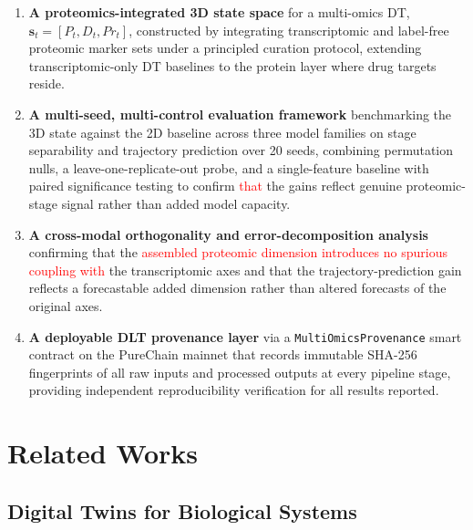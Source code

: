 \documentclass[5p,times,twocolumn]{elsarticle}
\newcommand{\rtag}[1]{}
\newcommand{\rev}[2]{\rtag{#1}\textcolor{red}{#2}}
\newcommand{\lang}[1]{\textcolor{red}{#1}}
\begin{document}
\begin{enumerate}
  \item \textbf{A proteomics-integrated 3D state space}
  for a multi-omics DT,
  $\mathbf{s}_{t} = [P_{t}, D_{t}, Pr_{t}]$,
  constructed by integrating transcriptomic and
  label-free proteomic marker sets under a principled
  curation protocol, extending transcriptomic-only DT
  baselines to the protein layer where drug targets
  reside.
  \item \textbf{A multi-seed, multi-control evaluation
    framework} benchmarking the 3D state against the 2D
  baseline across three model families on stage
  separability and trajectory prediction over 20 seeds,
  combining permutation nulls, a leave-one-replicate-out
  probe, and a single-feature baseline with paired
  significance testing to confirm \lang{that} the gains reflect
  genuine proteomic-stage signal rather than added model
  capacity.
  \item \textbf{A cross-modal orthogonality and
    error-decomposition analysis} confirming that the
  \rev{AC}{assembled proteomic dimension introduces no spurious
    coupling with} the transcriptomic axes and that the
  trajectory-prediction gain reflects a forecastable
  added dimension rather than altered forecasts of the
  original axes.
  \item \textbf{A deployable DLT provenance layer} via a
  \texttt{MultiOmicsProvenance} smart contract on the
  PureChain mainnet that records immutable SHA-256
  fingerprints of all raw inputs and processed outputs
  at every pipeline stage, providing independent
  reproducibility verification for all results reported.
\end{enumerate}

\section{Related Works}

\subsection{\textbf{Digital Twins for Biological Systems}}
\end{document}
